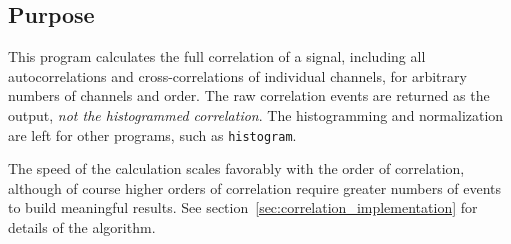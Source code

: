 \documentclass{article}
\begin{document}
\subsection{Purpose}
This program calculates the full correlation of a signal, including all autocorrelations and cross-correlations of individual channels, for arbitrary numbers of channels and order. The raw correlation events are returned as the output, \textit{not the histogrammed correlation}. The histogramming and normalization are left for other programs, such as \texttt{histogram}.

The speed of the calculation scales favorably with the order of correlation, although of course higher orders of correlation require greater numbers of events to build meaningful results. See section~\ref{sec:correlation_implementation} for details of the algorithm.
\end{document}
